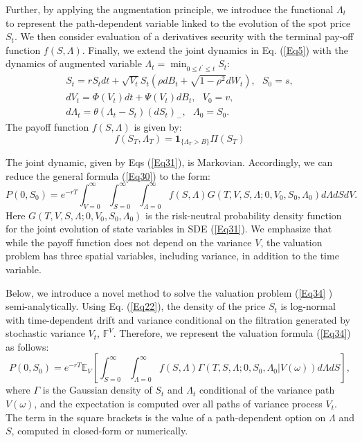 \documentclass{article}
\begin{document}
Further, by applying the augmentation principle, we introduce the functional 
$\Lambda _{t}$ to represent the path-dependent variable linked to the
evolution of the spot price $S_{t}$. We then consider evaluation of a
derivatives security with the terminal pay-off function $f(S,\Lambda )$.
Finally, we extend the joint dynamics in Eq. (\ref{Eq5}) with the dynamics
of augmented variable $\Lambda _{t}=\min_{0\leq t^{\prime }\leq t}S_{t}$:%
\begin{equation}
\begin{array}{c}
S_{t}=rS_{t}dt+\sqrt{V_{t}}S_{t}\left( \rho dB_{t}+\sqrt{1-\rho ^{2}}%
dW_{t}\right) ,\ \ \ S_{0}=s, \\ 
dV_{t}=\Phi (V_{t})dt+\Psi (V_{t})dB_{t},\ \ \ V_{0}=v, \\ 
d\Lambda _{t}=\theta \left( \Lambda _{t}-S_{t}\right) \left( dS_{t}\right)
_{-},\ \ \ \Lambda _{0}=S_{0}.%
\end{array}
\label{Eq31}
\end{equation}%
The payoff function $f(S,\Lambda )$ is given by: 
\begin{equation}
f(S_{T},\Lambda _{T})=\mathbf{1}_{\{\Lambda _{T}>B\}}\Pi \left( S_{T}\right)
\label{Eq32}
\end{equation}

The joint dynamic, given by Eqs (\ref{Eq31}), is Markovian. Accordingly, we
can reduce the general formula (\ref{Eq30}) to the form: 
\begin{equation}
P(0,S_{0})=e^{-rT}\int_{V=0}^{\infty }\int_{S=0}^{\infty }\int_{\Lambda
=0}^{\infty }f(S,\Lambda )G(T,V,S,\Lambda ;0,V_{0},S_{0},\Lambda
_{0})d\Lambda dSdV.  \label{Eq34}
\end{equation}%
Here $G(T,V,S,\Lambda ;0,V_{0},S_{0},\Lambda _{0})$ is the risk-neutral
probability density function for the joint evolution of state variables in
SDE (\ref{Eq31}). We emphasize that while the payoff function does not
depend on the variance $V$, the valuation problem has three spatial
variables, including variance, in addition to the time variable.

Below, we introduce a novel method to solve the valuation problem (\ref{Eq34}%
) semi-analytically. Using Eq. (\ref{Eq22}), the density of the price $S_{t}$
is log-normal with time-dependent drift and variance conditional on the
filtration generated by stochastic variance $V_{t}$, $\mathbb{F}^{V}$.
Therefore, we represent the valuation formula (\ref{Eq34}) as follows: 
\begin{equation}
P(0,S_{0})=e^{-rT}\mathbb{E}_{V}\left[ \int_{S=0}^{\infty }\int_{\Lambda
=0}^{\infty }f(S,\Lambda )\Gamma \left( \left. T,S,\Lambda ;0,S_{0},\Lambda
_{0}\right\vert V(\omega )\right) d\Lambda dS\right] ,  \label{Eq35}
\end{equation}%
where $\Gamma $ is the Gaussian density of $S_{t}$ and $\Lambda _{t}$
conditional of the variance path $V(\omega )$, and the expectation is
computed over all paths of variance process $V_{t}$. The term in the square
brackets is the value of a path-dependent option on $\Lambda $ and $S$,
computed in closed-form or numerically.
\end{document}
